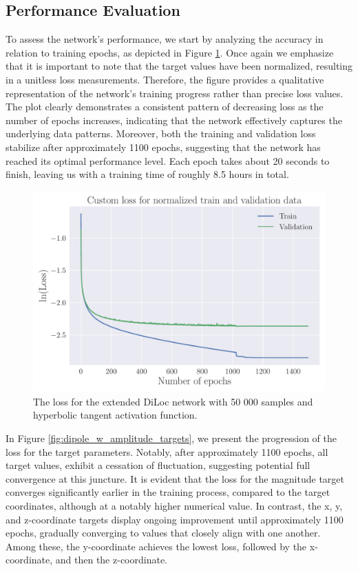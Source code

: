 \documentclass[a4paper, UKenglish, 11pt]{uiomaster}
\begin{document}
\subsection{Performance Evaluation}
To assess the network's performance, we start by analyzing the accuracy in relation to training epochs, as depicted in Figure \ref{fig:dipole_w_amplitude_loss}. Once again we emphasize that it is important to note that the target values have been normalized, resulting in a unitless loss measurements. Therefore, the figure provides a qualitative representation of the network's training progress rather than precise loss values. The plot clearly demonstrates a consistent pattern of decreasing loss as the number of epochs increases, indicating that the network effectively captures the underlying data patterns. Moreover, both the training and validation loss stabilize after approximately 1100 epochs, suggesting that the network has reached its optimal performance level. Each epoch takes about 20 seconds to finish, leaving us with a training time of roughly 8.5 hours in total.

\begin{figure}[!htb]
    \centering
    \includegraphics[width=\linewidth]{figures/NN_magnitude/Custom_Loss_amplitudes_test_custom_loss_tanh_32_0.001_0.35_0.1_0_1500_(0).pdf}
    \caption{The loss for the extended DiLoc network with 50 000 samples and hyperbolic tangent activation function.}
    \label{fig:dipole_w_amplitude_loss}
\end{figure}


In Figure \ref{fig:dipole_w_amplitude_targets}, we present the progression of the loss for the target parameters. Notably, after approximately 1100 epochs, all target values, exhibit a cessation of fluctuation, suggesting potential full convergence at this juncture. It is evident that the loss for the magnitude target converges significantly earlier in the training process, compared to the target coordinates, although at a notably higher numerical value. In contrast, the x, y, and z-coordinate targets display ongoing improvement until approximately 1100 epochs, gradually converging to values that closely align with one another. Among these, the y-coordinate achieves the lowest loss, followed by the x-coordinate, and then the z-coordinate.
\end{document}
